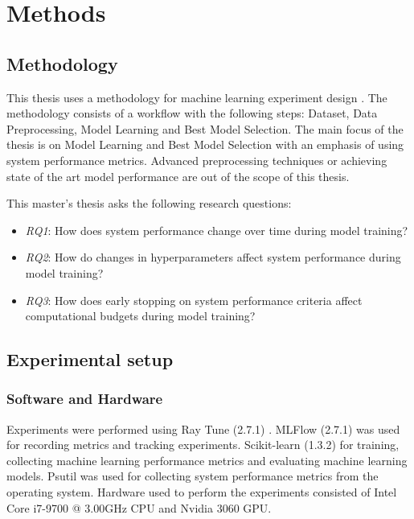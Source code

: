 \chapter{Methods}
\label{chap:methods}

\section{Methodology}

This thesis uses a methodology for machine learning experiment design \parencite{fernandez-lozanoMethodologyDesignExperiments2016}. The methodology consists of a workflow with the following steps: Dataset, Data Preprocessing, Model Learning and Best Model Selection. The main focus of the thesis is on Model Learning and Best Model Selection with an emphasis of using system performance metrics. Advanced preprocessing techniques or achieving state of the art model performance are out of the scope of this thesis.


This master's thesis asks the following research questions:
\begin{itemize}
    \item \emph{RQ1}: How does system performance change over time during model training?
    \item \emph{RQ2}: How do changes in hyperparameters affect system performance during model training?
    \item \emph{RQ3}: How does early stopping on system performance criteria affect computational budgets during model training?
          
\end{itemize}

\section{Experimental setup}

\subsection{Software and Hardware}

Experiments were performed using Ray Tune (2.7.1) \parencite{liawTuneResearchPlatform2018}. MLFlow (2.7.1) \parencite{chenDevelopmentsMLflowSystem2020} was used for recording metrics and tracking experiments. Scikit-learn (1.3.2) \parencite{pedregosaScikitlearnMachineLearning2011} for training, collecting machine learning performance metrics and evaluating machine learning models. Psutil \parencite{rodolaGiampaoloPsutil2023} was used for collecting system performance metrics from the operating system. Hardware used to perform the experiments consisted of Intel Core i7-9700 @ 3.00GHz CPU and Nvidia 3060 GPU.

